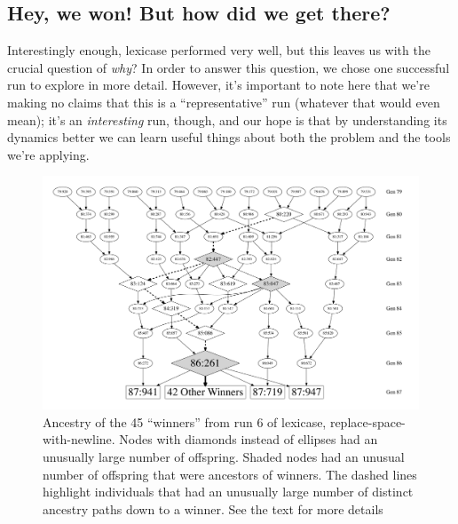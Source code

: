\subsection{Hey, we won! But how did we get there?}


Interestingly enough, lexicase performed very well, but this leaves us with the crucial question of \emph{why}? 
In order to answer this question, we chose one successful run to explore in more detail. However, it's important to note
here that we're making no claims that this is a ``representative'' run (whatever that would even
mean); it's an \emph{interesting} run, though, and our hope is that by understanding its dynamics
better we can learn useful things about both the problem and the tools we're applying.

\begin{figure}
	\vspace{0.6\columnwidth}
	\includegraphics[width=0.88\columnwidth]{figures/ancestors_of_winners_colons.pdf}
	\caption{Ancestry of the 45 ``winners'' from run 6 of lexicase, replace-space-with-newline. Nodes
		with diamonds instead of ellipses had an unusually large number of offspring. Shaded nodes
		had an unusual number of offspring that were ancestors of winners. The dashed lines highlight
		individuals that had an unusually large number of distinct ancestry paths down to a winner.
		See the text for more details}
	\label{fig:winnerAncestors}
\end{figure}

